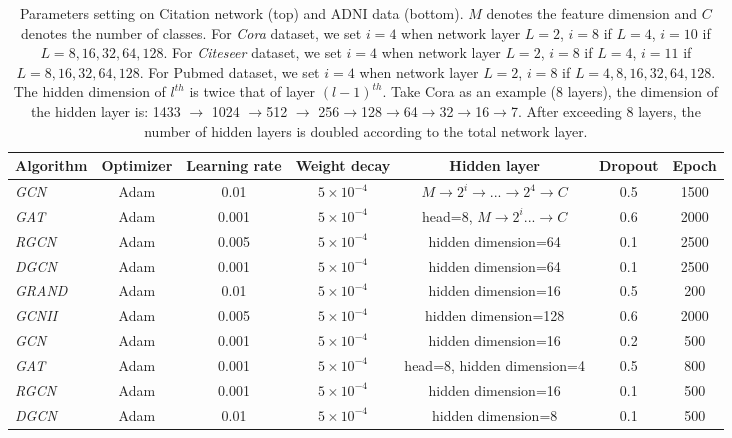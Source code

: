 \documentclass{article}
\begin{document}
\begin{table}[h]
\caption{Parameters setting on Citation network (top) and ADNI data (bottom). $M$ denotes the feature dimension and $C$ denotes the number of classes. For \textit{Cora} dataset, we set $i=4$ when network layer $L=2$, $i=8$ if $L=4$, $i=10$ if $L=8, 16, 32, 64,128$.  For \textit{Citeseer} dataset, we set $i=4$ when network layer $L=2$, $i=8$ if $L=4$, $i=11$ if $L=8, 16, 32, 64,128$. For Pubmed dataset, we set $i=4$ when network layer $L=2$, $i=8$ if $L=4, 8, 16, 32, 64,128$. The hidden dimension of $l^{th}$ is twice that of layer $(l-1)^{th}$. Take Cora as an example (8 layers), the dimension of the hidden layer is: 1433 $\to $ 1024 $\to $512 $\to $ 256$\to $128$\to $64$\to $32$\to $16$\to $7. After exceeding 8 layers, the number of hidden layers is doubled according to the total network layer.}
\label{parameter}
\begin{center}
\begin{small}
\setlength{\tabcolsep}{4pt}
\begin{tabular}{lcccccc}
\toprule
 Algorithm & Optimizer & Learning rate  & Weight decay & Hidden layer & Dropout & Epoch\\
\midrule
\textit{GCN} & Adam &  0.01  & $5\times 10^{-4}$ & $M \to 2^i\to...\to 2^4 \to C$ & 0.5 &1500\\
\hline
 \textit{GAT} & Adam &  0.001  & $5\times 10^{-4}$ & head=8, $M \to 2^i ...\to C$ & 0.6 &2000\\
\hline
 \textit{RGCN} & Adam & 0.005 & $5\times 10^{-4}$& hidden dimension=64 &0.1& 2500\\
\hline
 \textit{DGCN} & Adam &  0.001  & $5\times 10^{-4}$ & hidden dimension=64 & 0.1 &2500\\
\hline
 \textit{GRAND} & Adam &  0.01  & $5\times 10^{-4}$ & hidden dimension=16 & 0.5 &200\\
\hline
  \textit{GCNII} & Adam &  0.005  & $5\times 10^{-4}$ & hidden dimension=128 & 0.6 &2000\\
\hline
\hline
\hline
   \textit{GCN} & Adam &  0.001  & $5\times 10^{-4}$ & hidden dimension=16 & 0.2 &500\\
\hline
 \textit{GAT} & Adam &  0.001  & $5\times 10^{-4}$ & head=8, hidden dimension=4 & 0.5 &800\\
\hline
 \textit{RGCN} & Adam & 0.001 & $5\times 10^{-4}$& hidden dimension=16 &0.1& 500\\
\hline
 \textit{DGCN} & Adam &  0.01  & $5\times 10^{-4}$ & hidden dimension=8 & 0.1 &500\\

\end{tabular}
\end{small}
\end{center}
\end{table}
\end{document}

